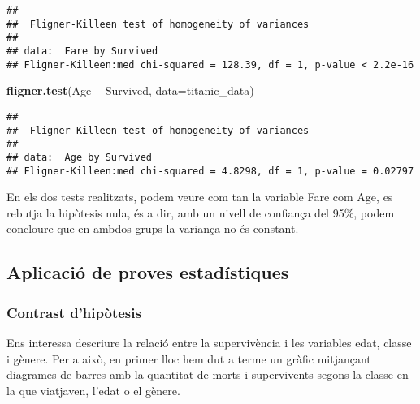 \documentclass[]{article}
\newenvironment{Shaded}{\begin{snugshade}}{\end{snugshade}}
\newcommand{\DataTypeTok}[1]{\textcolor[rgb]{0.13,0.29,0.53}{#1}}
\newcommand{\KeywordTok}[1]{\textcolor[rgb]{0.13,0.29,0.53}{\textbf{#1}}}
\newcommand{\NormalTok}[1]{#1}
\newcommand{\OperatorTok}[1]{\textcolor[rgb]{0.81,0.36,0.00}{\textbf{#1}}}
\newcommand{\StringTok}[1]{\textcolor[rgb]{0.31,0.60,0.02}{#1}}
\begin{document}
\begin{verbatim}
## 
##  Fligner-Killeen test of homogeneity of variances
## 
## data:  Fare by Survived
## Fligner-Killeen:med chi-squared = 128.39, df = 1, p-value < 2.2e-16
\end{verbatim}

\begin{Shaded}
\begin{Highlighting}[]
\KeywordTok{fligner.test}\NormalTok{(Age }\OperatorTok{~}\StringTok{ }\NormalTok{Survived, }\DataTypeTok{data=}\NormalTok{titanic_data)}
\end{Highlighting}
\end{Shaded}

\begin{verbatim}
## 
##  Fligner-Killeen test of homogeneity of variances
## 
## data:  Age by Survived
## Fligner-Killeen:med chi-squared = 4.8298, df = 1, p-value = 0.02797
\end{verbatim}

En els dos tests realitzats, podem veure com tan la variable Fare com
Age, es rebutja la hipòtesis nula, és a dir, amb un nivell de confiança
del 95\%, podem concloure que en ambdos grups la variança no és
constant.

\hypertarget{aplicaciuxf3-de-proves-estaduxedstiques}{%
\subsection{Aplicació de proves
estadístiques}\label{aplicaciuxf3-de-proves-estaduxedstiques}}

\hypertarget{contrast-dhipuxf2tesis}{%
\subsubsection{Contrast d'hipòtesis}\label{contrast-dhipuxf2tesis}}

Ens interessa descriure la relació entre la supervivència i les
variables edat, classe i gènere. Per a això, en primer lloc hem dut a
terme un gràfic mitjançant diagrames de barres amb la quantitat de morts
i supervivents segons la classe en la que viatjaven, l'edat o el gènere.
\end{document}
